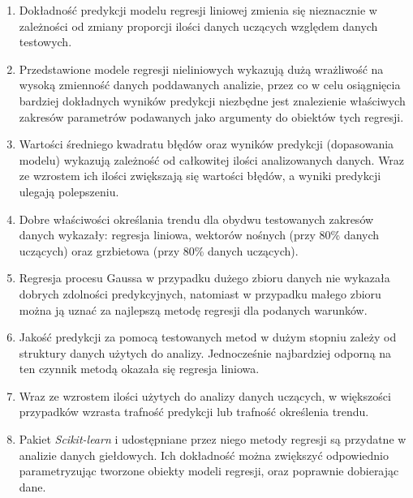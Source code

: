 \begin{enumerate}
 \item Dokładność predykcji modelu regresji liniowej zmienia się nieznacznie w zależności od zmiany proporcji ilości danych uczących względem danych testowych.
 \item Przedstawione modele regresji nieliniowych wykazują dużą wrażliwość na wysoką zmienność danych poddawanych analizie, przez co w celu osiągnięcia bardziej dokładnych wyników predykcji niezbędne jest znalezienie właściwych zakresów parametrów podawanych jako argumenty do obiektów tych regresji.
 \item Wartości średniego kwadratu błędów oraz wyników predykcji (dopasowania modelu) wykazują zależność od całkowitej ilości analizowanych danych. Wraz ze wzrostem ich ilości zwiększają się wartości błędów, a wyniki predykcji ulegają polepszeniu.
 \item Dobre właściwości określania trendu dla obydwu testowanych zakresów danych wykazały: regresja liniowa, wektorów nośnych (przy 80\% danych uczących) oraz grzbietowa (przy 80\% danych uczących).
 \item Regresja procesu Gaussa w przypadku dużego zbioru danych nie wykazała dobrych zdolności predykcyjnych, natomiast w przypadku małego zbioru można ją uznać za najlepszą metodę regresji dla podanych warunków.
 \item Jakość predykcji za pomocą testowanych metod w dużym stopniu zależy od struktury danych użytych do analizy. Jednocześnie najbardziej odporną na ten czynnik metodą okazała się regresja liniowa.
 \item Wraz ze wzrostem ilości użytych do analizy danych uczących, w większości przypadków wzrasta trafność predykcji lub trafność określenia trendu.
 \item Pakiet \textit{Scikit-learn} i udostępniane przez niego metody regresji są przydatne w analizie danych giełdowych. Ich dokładność można zwiększyć odpowiednio parametryzując tworzone obiekty modeli regresji, oraz poprawnie dobierając dane.
\end{enumerate}


